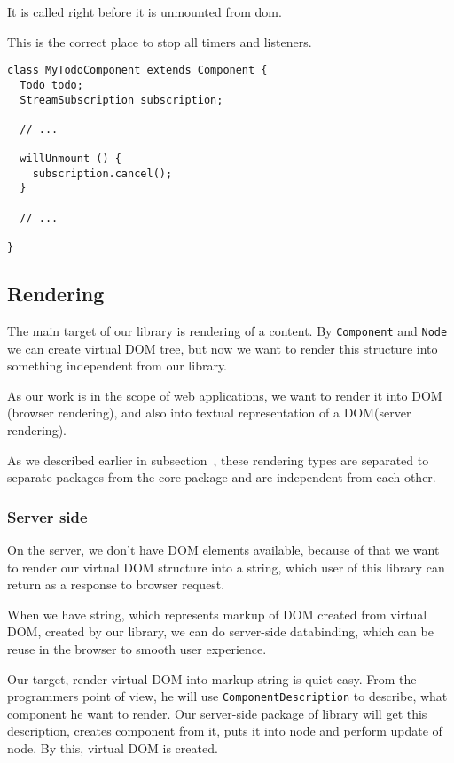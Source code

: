\documentclass[oneside, 12pt]{book}
\begin{document}
      It is called right before it is unmounted from dom. 

      This is the correct place to stop all timers and listeners.
      \begin{verbatim}
class MyTodoComponent extends Component {
  Todo todo;
  StreamSubscription subscription;

  // ...

  willUnmount () {
    subscription.cancel();
  }

  // ...

}
      \end{verbatim}



  \subsection{Rendering}\label{subsec:our-architecture-rendering}
    The main target of our library is rendering of a content. 
    By \texttt{Component} and \texttt{Node} we can create virtual DOM tree, 
    but now we want to render this structure into something independent from our library. 

    As our work is in the scope of web applications, we want to render it into DOM (browser rendering), 
    and also into textual representation of a DOM(server rendering).

    As we described earlier in subsection~, 
    these rendering types are separated to separate packages from the core package and are independent from each other. 

    \subsubsection{Server side}\label{subsec:our-architecture-rendering-server}
      On the server, we don't have DOM elements available, 
      because of that we want to render our virtual DOM structure into a string,
      which user of this library can return as a response to browser request.

      When we have string, which represents markup of DOM created from virtual DOM, 
      created by our library, we can do server-side databinding, 
      which can be reuse in the browser to smooth user experience. 

      Our target, render virtual DOM into markup string is quiet easy.
      From the programmers point of view, he will use \texttt{ComponentDescription} to describe, 
      what component he want to render. 
      Our server-side package of library will get this description, creates component from it, 
      puts it into node and perform update of node. 
      By this, virtual DOM is created. 
\end{document}
